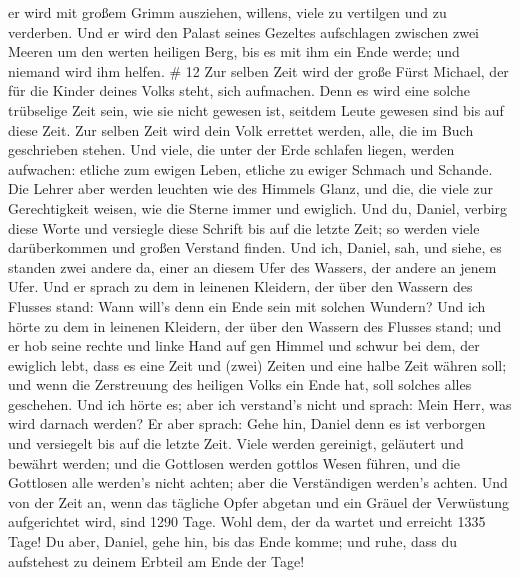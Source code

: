 er wird mit großem Grimm ausziehen, willens, viele zu vertilgen und zu
verderben.  Und er wird den Palast seines Gezeltes
aufschlagen zwischen zwei Meeren um den werten heiligen Berg, bis es mit
ihm ein Ende werde; und niemand wird ihm helfen. \# 12  Zur
selben Zeit wird der große Fürst Michael, der für die Kinder deines
Volks steht, sich aufmachen. Denn es wird eine solche trübselige Zeit
sein, wie sie nicht gewesen ist, seitdem Leute gewesen sind bis auf
diese Zeit. Zur selben Zeit wird dein Volk errettet werden, alle, die im
Buch geschrieben stehen.  Und viele, die unter der Erde
schlafen liegen, werden aufwachen: etliche zum ewigen Leben, etliche zu
ewiger Schmach und Schande.  Die Lehrer aber werden leuchten
wie des Himmels Glanz, und die, die viele zur Gerechtigkeit weisen, wie
die Sterne immer und ewiglich.  Und du, Daniel, verbirg
diese Worte und versiegle diese Schrift bis auf die letzte Zeit; so
werden viele darüberkommen und großen Verstand finden.  Und
ich, Daniel, sah, und siehe, es standen zwei andere da, einer an diesem
Ufer des Wassers, der andere an jenem Ufer.  Und er sprach
zu dem in leinenen Kleidern, der über den Wassern des Flusses stand:
Wann will's denn ein Ende sein mit solchen Wundern?  Und ich
hörte zu dem in leinenen Kleidern, der über den Wassern des Flusses
stand; und er hob seine rechte und linke Hand auf gen Himmel und schwur
bei dem, der ewiglich lebt, dass es eine Zeit und (zwei) Zeiten und eine
halbe Zeit währen soll; und wenn die Zerstreuung des heiligen Volks ein
Ende hat, soll solches alles geschehen.  Und ich hörte es;
aber ich verstand's nicht und sprach: Mein Herr, was wird darnach
werden?  Er aber sprach: Gehe hin, Daniel denn es ist
verborgen und versiegelt bis auf die letzte Zeit.  Viele
werden gereinigt, geläutert und bewährt werden; und die Gottlosen werden
gottlos Wesen führen, und die Gottlosen alle werden's nicht achten; aber
die Verständigen werden's achten.  Und von der Zeit an,
wenn das tägliche Opfer abgetan und ein Gräuel der Verwüstung
aufgerichtet wird, sind 1290 Tage.  Wohl dem, der da wartet
und erreicht 1335 Tage!  Du aber, Daniel, gehe hin, bis das
Ende komme; und ruhe, dass du aufstehest zu deinem Erbteil am Ende der
Tage!
